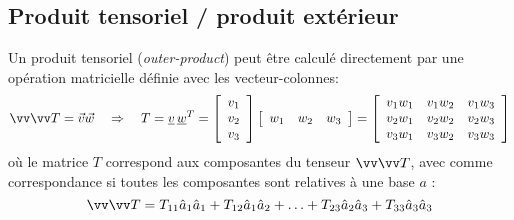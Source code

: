 \subsection{Produit tensoriel / produit extérieur}
%
Un produit tensoriel (\textit{outer-product}) peut être calculé directement par une opération matricielle définie avec les vecteur-colonnes:
\begin{equation}
\tensor{T} = \vec{v} \vec{w} \quad \Rightarrow \quad  T = \col{v} \, \col{w}^T = 
\left[ \begin{array}{c}     v_1 \\ v_2 \\ v_3  \end{array} \right]
\left[ \begin{array}{c c c} w_1 &  w_2 &  w_3  \end{array} \right] = 
\left[ \begin{array}{c c c}
v_1 w_1 & v_1 w_2 & v_1 w_3  \\ 
v_2 w_1 & v_2 w_2 & v_2 w_3         \\ 
v_3 w_1 & v_3 w_2 & v_3 w_3 
\end{array}  \right]
\end{equation} 
où le matrice $T$ correspond aux composantes du tenseur $\tensor{T}$, avec comme correspondance si toutes les composantes sont relatives à une base $a$ :
\begin{equation}
\tensor{T} = T_{11} \hat{a}_1 \hat{a}_1  + T_{12} \hat{a}_1 \hat{a}_2 + \hdots + T_{23} \hat{a}_2 \hat{a}_3  + T_{33} \hat{a}_3 \hat{a}_3 
\end{equation} 


